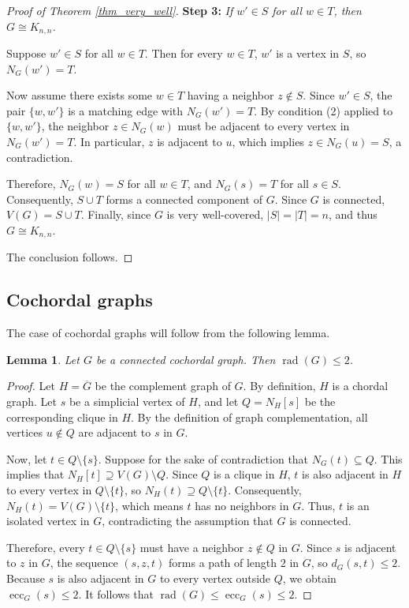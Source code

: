\documentclass[12pt]{amsart}
\numberwithin{equation}{section}
\newtheorem{lem}[thm]{\bf Lemma}
\theoremstyle{definition}
\begin{document}
\begin{proof}[Proof of Theorem \ref{thm_very_well}]
\smallskip
\noindent\textbf{Step 3:} \emph{If $w' \in S$ for all $w \in T$, then $G \cong K_{n,n}$.}

Suppose $w' \in S$ for all $w \in T$. Then for every $w \in T$, $w'$ is a vertex in $S$, so $N_G(w') = T$. 

Now assume there exists some $w \in T$ having a neighbor $z \notin S$. Since $w' \in S$, the pair $\{w, w'\}$ is a matching edge with $N_G(w') = T$. By condition (2) applied to $\{w, w'\}$, the neighbor $z \in N_G(w)$ must be adjacent to every vertex in $N_G(w') = T$. In particular, $z$ is adjacent to $u$, which implies $z \in N_G(u) = S$, a contradiction. 

Therefore, $N_G(w) = S$ for all $w \in T$, and $N_G(s) = T$ for all $s \in S$. Consequently, $S \cup T$ forms a connected component of $G$. Since $G$ is connected, $V(G) = S \cup T$. Finally, since $G$ is very well-covered, $|S| = |T| = n$, and thus $G \cong K_{n,n}$.

The conclusion follows.
\end{proof}

\subsection{Cochordal graphs}
The case of cochordal graphs will follow from the following lemma.

\begin{lem}\label{lem_rad_cochor} 
Let $G$ be a connected cochordal graph. Then $\operatorname{rad}(G) \le 2$.
\end{lem}

\begin{proof} 
Let $H = \overline{G}$ be the complement graph of $G$. By definition, $H$ is a chordal graph. Let $s$ be a simplicial vertex of $H$, and let $Q = N_H[s]$ be the corresponding clique in $H$. By the definition of graph complementation, all vertices $u \notin Q$ are adjacent to $s$ in $G$.

Now, let $t \in Q \setminus \{s\}$. Suppose for the sake of contradiction that $N_G(t) \subseteq Q$. This implies that $N_H[t] \supseteq V(G) \setminus Q$. Since $Q$ is a clique in $H$, $t$ is also adjacent in $H$ to every vertex in $Q \setminus \{t\}$, so $N_H(t) \supseteq Q \setminus \{t\}$. Consequently, $N_H(t) = V(G) \setminus \{t\}$, which means $t$ has no neighbors in $G$. Thus, $t$ is an isolated vertex in $G$, contradicting the assumption that $G$ is connected.

Therefore, every $t \in Q \setminus \{s\}$ must have a neighbor $z \notin Q$ in $G$. Since $s$ is adjacent to $z$ in $G$, the sequence $(s, z, t)$ forms a path of length $2$ in $G$, so $d_G(s, t) \le 2$. Because $s$ is also adjacent in $G$ to every vertex outside $Q$, we obtain $\operatorname{ecc}_G(s) \le 2$. It follows that $\operatorname{rad}(G) \le \operatorname{ecc}_G(s) \le 2$.
\end{proof}
\end{document}
